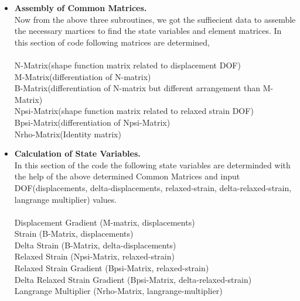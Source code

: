 \documentclass[12pt]{article}
\begin{document}
\begin{itemize}
	\item \textbf{Assembly of Common Matrices.} \\
	Now from the above three subroutines, we got the suffiecient data to assemble the necessary martices to find the state variables and element matrices. In this section of code following matrices are determined, \\ \\
	N-Matrix(shape function matrix related to displacement DOF) \\
	M-Matrix(differentiation of N-matrix) \\
	B-Matrix(differentiation of N-matrix but different arrangement than M-Matrix) \\
	Npsi-Matrix(shape function matrix related to relaxed strain DOF) \\
	Bpsi-Matrix(differentiation of Npsi-Matrix) \\
	Nrho-Matrix(Identity matrix)
	
	\item \textbf{Calculation of State Variables.}\\
	In this section of the code the following state variables are determinded with the help of the above determined Common Matrices and input DOF(displacements, delta-displacements, relaxed-strain, delta-relaxed-strain, langrange multiplier) values. \\ \\
	Displacement Gradient (M-matrix, displacements) \\
	Strain (B-Matrix, displacements) \\
	Delta Strain (B-Matrix, delta-displacements) \\
	Relaxed Strain (Npsi-Matrix, relaxed-strain) \\
	Relaxed Strain Gradient (Bpsi-Matrix, relaxed-strain) \\
	Delta Relaxed Strain Gradient (Bpsi-Matrix, delta-relaxed-strain) \\
	Langrange Multiplier (Nrho-Matrix, langrange-multiplier)
	

\end{itemize}
\end{document}
